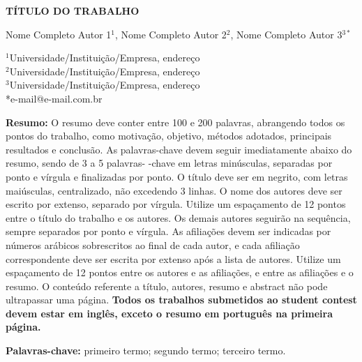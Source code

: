 \documentclass[a4paper,12pt,fleqn]{article}
\begin{document}
	\nocite{sparrow1980, wei2024, barros2015, ratkowsky1983, fernanda2022, coraucci2016}
	\vspace*{2.5cm} 

	\begin{center}
		{\bfseries\fontsize{14}{16}\selectfont TÍTULO DO TRABALHO}
	\end{center}

	\begin{center}
		{\fontsize{12}{14}\selectfont Nome Completo Autor 1$^{1}$, Nome Completo Autor 2$^{2}$, Nome Completo Autor 3$^{3*}$}
		
		\vspace{0.3cm}

		{\fontsize{10}{12}\selectfont
			$^{1}$Universidade/Instituição/Empresa, endereço\\
			$^{2}$Universidade/Instituição/Empresa, endereço\\
			$^{3}$Universidade/Instituição/Empresa, endereço\\
			*e-mail@e-mail.com.br %
		}
	\end{center}

	\begin{justify}
		{\fontsize{12}{14}\selectfont
			\textbf{Resumo:} O resumo deve conter entre 100 e 200 palavras, abrangendo todos os pontos do trabalho, como motivação, objetivo, métodos adotados, principais resultados e conclusão. As palavras-chave devem seguir imediatamente abaixo do resumo, sendo de 3 a 5 palavras- -chave em letras minúsculas, separadas por ponto e vírgula e finalizadas por ponto. O título deve ser em negrito, com letras maiúsculas, centralizado, não excedendo 3 linhas. O nome dos autores deve ser escrito por extenso, separado por vírgula. Utilize um espaçamento de 12 pontos entre o título do trabalho e os autores. Os demais autores seguirão na sequência, sempre separados por ponto e vírgula. As afiliações devem ser indicadas por números arábicos sobrescritos ao final de cada autor, e cada afiliação correspondente deve ser escrita por extenso após a lista de autores. Utilize um espaçamento de 12 pontos entre os autores e as afiliações, e entre as afiliações e o resumo. O conteúdo referente a título, autores, resumo e abstract não pode ultrapassar uma página. \textbf{Todos os trabalhos submetidos ao student contest devem estar em inglês, exceto o resumo em português na primeira página. }

			\noindent
			\textbf{Palavras-chave:} primeiro termo; segundo termo; terceiro termo.}
	\end{justify}
\end{document}
